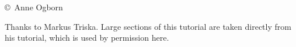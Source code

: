 \secdown
{}
\copyright\ Anne Ogborn 
\bigskip

Thanks to Markus Triska. Large sections of this tutorial are taken directly from
his tutorial, which is used by permission here.













\secup